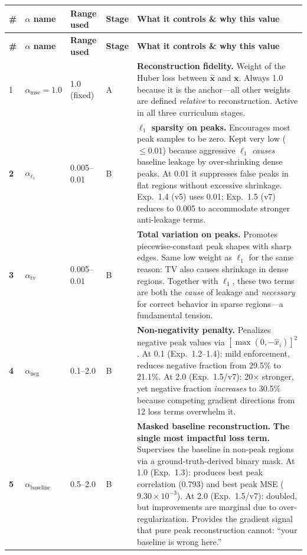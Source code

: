\documentclass[11pt, letterpaper]{article}
\begin{document}
\renewcommand{\arraystretch}{1.5}
{\small
\begin{longtable}{@{} >{\bfseries}p{0.8cm} p{3.2cm} p{2.2cm} p{1.5cm} p{6.5cm} @{}}
\toprule
\textbf{\#} & \textbf{$\alpha$ name} & \textbf{Range used} & \textbf{Stage} & \textbf{What it controls \& why this value} \\
\midrule
\endfirsthead
\midrule
\textbf{\#} & \textbf{$\alpha$ name} & \textbf{Range used} & \textbf{Stage} & \textbf{What it controls \& why this value} \\
\midrule
\endhead

1 & $\alpha_{\text{mse}} = 1.0$ & 1.0 (fixed) & A &
\textbf{Reconstruction fidelity.} Weight of the Huber loss between $\hat{\mathbf{x}}$ and $\mathbf{x}$.
Always 1.0 because it is the anchor---all other weights are defined \emph{relative} to reconstruction.
Active in all three curriculum stages. \\

2 & $\alpha_{\ell_1}$ & 0.005--0.01 & B &
\textbf{$\ell_1$ sparsity on peaks.} Encourages most peak samples to be zero.
Kept very low ($\leq 0.01$) because aggressive $\ell_1$ \emph{causes} baseline leakage by over-shrinking
dense peaks.  At 0.01 it suppresses false peaks in flat regions without excessive shrinkage.
Exp.~1.4 (v5) uses 0.01; Exp.~1.5 (v7) reduces to 0.005 to accommodate stronger anti-leakage terms. \\

3 & $\alpha_{\text{tv}}$ & 0.005--0.01 & B &
\textbf{Total variation on peaks.} Promotes piecewise-constant peak shapes with sharp edges.
Same low weight as $\ell_1$ for the same reason: TV also causes shrinkage in dense regions.
Together with $\ell_1$, these two terms are both the \emph{cause} of leakage and \emph{necessary}
for correct behavior in sparse regions---a fundamental tension. \\

4 & $\alpha_{\text{neg}}$ & 0.1--2.0 & B &
\textbf{Non-negativity penalty.} Penalizes negative peak values via $[\max(0, -\hat{x}_i)]^2$.
At 0.1 (Exp.~1.2--1.4): mild enforcement, reduces negative fraction from 29.5\% to 21.1\%.
At 2.0 (Exp.~1.5/v7): 20$\times$ stronger, yet negative fraction \emph{increases} to 30.5\%
because competing gradient directions from 12 loss terms overwhelm it. \\

5 & $\alpha_{\text{baseline}}$ & 0.5--2.0 & B &
\textbf{Masked baseline reconstruction.} \textbf{The single most impactful loss term.}
Supervises the baseline in non-peak regions via a ground-truth-derived binary mask.
At 1.0 (Exp.~1.3): produces best peak correlation (0.793) and best peak MSE ($9.30 \times 10^{-3}$).
At 2.0 (Exp.~1.5/v7): doubled, but improvements are marginal due to over-regularization.
Provides the gradient signal that pure peak reconstruction cannot: ``your baseline is wrong here.'' \\


\end{longtable}}
\end{document}
